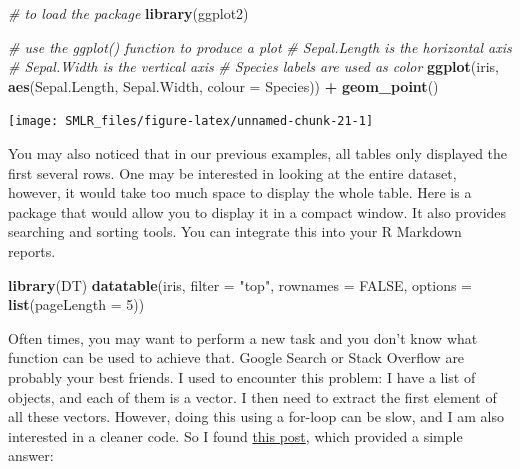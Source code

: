 \documentclass[
]{book}
\newenvironment{Shaded}{\begin{snugshade}}{\end{snugshade}}
\newcommand{\AttributeTok}[1]{\textcolor[rgb]{0.13,0.29,0.53}{#1}}
\newcommand{\CommentTok}[1]{\textcolor[rgb]{0.56,0.35,0.01}{\textit{#1}}}
\newcommand{\ConstantTok}[1]{\textcolor[rgb]{0.56,0.35,0.01}{#1}}
\newcommand{\DecValTok}[1]{\textcolor[rgb]{0.00,0.00,0.81}{#1}}
\newcommand{\FunctionTok}[1]{\textcolor[rgb]{0.13,0.29,0.53}{\textbf{#1}}}
\newcommand{\NormalTok}[1]{#1}
\newcommand{\SpecialCharTok}[1]{\textcolor[rgb]{0.81,0.36,0.00}{\textbf{#1}}}
\newcommand{\StringTok}[1]{\textcolor[rgb]{0.31,0.60,0.02}{#1}}
\theoremstyle{definition}
\theoremstyle{definition}
\theoremstyle{definition}
\theoremstyle{definition}
\theoremstyle{remark}
\begin{document}
\begin{Shaded}
\begin{Highlighting}[]
    \CommentTok{\# to load the package}
    \FunctionTok{library}\NormalTok{(ggplot2)}
  
    \CommentTok{\# use the ggplot() function to produce a plot}
    \CommentTok{\# Sepal.Length is the horizontal axis}
    \CommentTok{\# Sepal.Width is the vertical axis}
    \CommentTok{\# Species labels are used as color}
    \FunctionTok{ggplot}\NormalTok{(iris, }\FunctionTok{aes}\NormalTok{(Sepal.Length, Sepal.Width, }\AttributeTok{colour =}\NormalTok{ Species)) }\SpecialCharTok{+} 
      \FunctionTok{geom\_point}\NormalTok{()  }
\end{Highlighting}
\end{Shaded}

\begin{center}\texttt{[image: SMLR\_files/figure-latex/unnamed-chunk-21-1]} \end{center}

You may also noticed that in our previous examples, all tables only displayed the first several rows. One may be interested in looking at the entire dataset, however, it would take too much space to display the whole table. Here is a package that would allow you to display it in a compact window. It also provides searching and sorting tools. You can integrate this into your R Markdown reports.

\begin{Shaded}
\begin{Highlighting}[]
    \FunctionTok{library}\NormalTok{(DT)}
    \FunctionTok{datatable}\NormalTok{(iris, }\AttributeTok{filter =} \StringTok{"top"}\NormalTok{, }\AttributeTok{rownames =} \ConstantTok{FALSE}\NormalTok{,}
              \AttributeTok{options =} \FunctionTok{list}\NormalTok{(}\AttributeTok{pageLength =} \DecValTok{5}\NormalTok{))}
\end{Highlighting}
\end{Shaded}

Often times, you may want to perform a new task and you don't know what function can be used to achieve that. Google Search or Stack Overflow are probably your best friends. I used to encounter this problem: I have a list of objects, and each of them is a vector. I then need to extract the first element of all these vectors. However, doing this using a for-loop can be slow, and I am also interested in a cleaner code. So I found \href{https://stackoverflow.com/questions/44176908/r-list-get-first-item-of-each-element}{this post}, which provided a simple answer:
\end{document}

